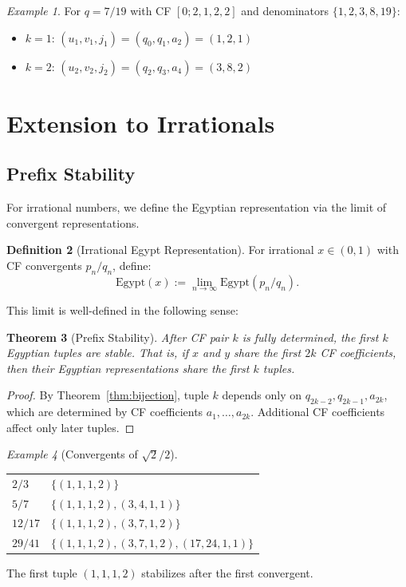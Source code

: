 \documentclass[11pt]{article}
\newtheorem{theorem}{Theorem}
\theoremstyle{definition}
\newtheorem{definition}[theorem]{Definition}
\theoremstyle{remark}
\newtheorem{example}[theorem]{Example}
\begin{document}
\begin{example}
For $q = 7/19$ with CF $[0; 2, 1, 2, 2]$ and denominators $\{1, 2, 3, 8, 19\}$:
\begin{itemize}
\item $k=1$: $(u_1, v_1, j_1) = (q_0, q_1, a_2) = (1, 2, 1)$ \checkmark
\item $k=2$: $(u_2, v_2, j_2) = (q_2, q_3, a_4) = (3, 8, 2)$ \checkmark
\end{itemize}
\end{example}

\section{Extension to Irrationals}

\subsection{Prefix Stability}

For irrational numbers, we define the Egyptian representation via the limit
of convergent representations.

\begin{definition}[Irrational Egypt Representation]
For irrational $x \in (0, 1)$ with CF convergents $p_n/q_n$, define:
\[
\text{Egypt}(x) := \lim_{n \to \infty} \text{Egypt}(p_n/q_n).
\]
\end{definition}

This limit is well-defined in the following sense:

\begin{theorem}[Prefix Stability]\label{thm:prefix}
After CF pair $k$ is fully determined, the first $k$ Egyptian tuples are stable.
That is, if $x$ and $y$ share the first $2k$ CF coefficients, then their
Egyptian representations share the first $k$ tuples.
\end{theorem}

\begin{proof}
By Theorem~\ref{thm:bijection}, tuple $k$ depends only on $q_{2k-2}, q_{2k-1}, a_{2k}$,
which are determined by CF coefficients $a_1, \ldots, a_{2k}$. Additional CF
coefficients affect only later tuples.
\end{proof}

\begin{example}[Convergents of $\sqrt{2}/2$]
\begin{center}
\begin{tabular}{l l}
$2/3$ & $\{(1, 1, 1, 2)\}$ \\
$5/7$ & $\{(1, 1, 1, 2), (3, 4, 1, 1)\}$ \\
$12/17$ & $\{(1, 1, 1, 2), (3, 7, 1, 2)\}$ \\
$29/41$ & $\{(1, 1, 1, 2), (3, 7, 1, 2), (17, 24, 1, 1)\}$
\end{tabular}
\end{center}
The first tuple $(1, 1, 1, 2)$ stabilizes after the first convergent.
\end{example}
\end{document}
